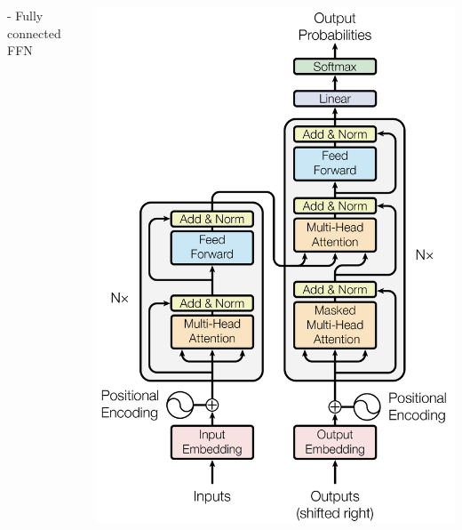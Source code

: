\documentclass[professionalfont]{beamer}
\begin{document}
\begin{frame}
\begin{columns}
{\begin{itemize}
            - Fully connected FFN
\end{itemize}
}
    \includegraphics[width=1.0\linewidth]{figure/1.png}
\end{columns}

\end{frame}
\end{document}
